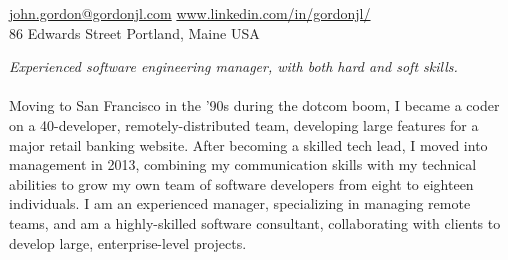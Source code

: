 \documentclass[10pt,a4paper]{article}
\begin{document}
\sloppy  %



\nobreakvspace{0.3em}  %

\noindent\href{mailto:john.gordon@gordonjl.com}{john.gordon\mbox{}@\mbox{}gordonjl.com}\sbull
{}\sbull
\href{https://www.linkedin.com/in/gordonjl/}{www.linkedin.com/in/gordonjl/}
\\
86 Edwards Street\sbull
Portland, Maine\sbull
USA

\spacedhrule{0.9em}{-0.4em}  %


\vspace{-1.3em}  %
\begin{multicols}{2}  %
\noindent \emph{Experienced software engineering manager, with both hard 
and soft skills.}
\\
\\
Moving to San Francisco in the '90s during the dotcom boom, I became a coder on a 40-developer, remotely-distributed team, developing large features for a major retail banking website. After becoming a skilled tech lead, I moved into management in 2013, combining my communication skills with my technical abilities to grow my own team of software developers from eight to eighteen individuals. I am an experienced manager, specializing in managing remote teams, and am a highly-skilled software consultant, collaborating with clients to develop large, enterprise-level projects.
\end{multicols}


\spacedhrule{0em}{-0.4em}

\end{document}
